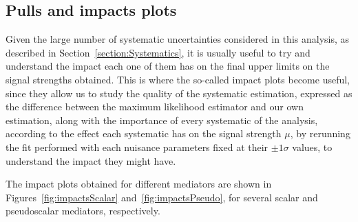 \documentclass[a4paper, 10pt, openright]{report}
\begin{document}
\begin{appendices}
\chapter{Pulls and impacts plots} \label{appendix:Impact}

Given the large number of systematic uncertainties considered in this analysis, as described in Section~\ref{section:Systematics}, it is usually useful to try and understand the impact each one of them has on the final upper limits on the signal strengths obtained. This is where the so-called impact plots become useful, since they allow us to study the quality of the systematic estimation, expressed as the difference between the maximum likelihood estimator and our own estimation, along with the importance of every systematic of the analysis, according to the effect each systematic has on the signal strength $\mu$, by rerunning the fit performed with each nuisance parameters fixed at their $\pm 1 \sigma$ values, to understand the impact they might have.

The impact plots obtained for different mediators are shown in Figures~\ref{fig:impactsScalar} and~\ref{fig:impactsPseudo}, for several scalar and pseudoscalar mediators, respectively.


\end{appendices}
\end{document}
